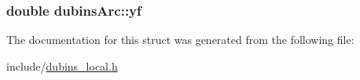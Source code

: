 \subsubsection[{\texorpdfstring{yf}{yf}}]{\setlength{\rightskip}{0pt plus 5cm}double dubins\+Arc\+::yf}\hypertarget{structdubinsArc_a782cb717a7d9ab1836d3fae17073f104}{}\label{structdubinsArc_a782cb717a7d9ab1836d3fae17073f104}


The documentation for this struct was generated from the following file\+:\begin{DoxyCompactItemize}
\item 
include/\hyperlink{dubins__local_8h}{dubins\+\_\+local.\+h}\end{DoxyCompactItemize}
